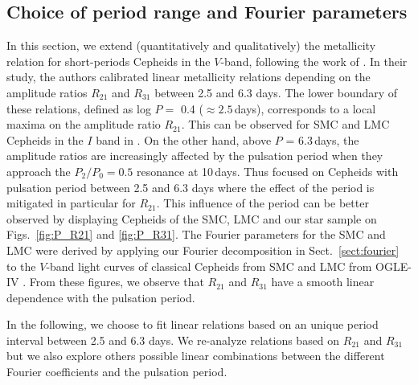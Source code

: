 \documentclass[article]{aa} %
\begin{document}
\subsection{Choice of period range and Fourier parameters}\label{fig:qualitative}
In this section, we extend (quantitatively and qualitatively) the metallicity relation for short-periods Cepheids in the $V$-band, following the work of \cite{Klagyivik2013}.  In their study, the authors calibrated linear metallicity relations depending on the amplitude ratios $R_{21}$ and $R_{31}$ between 2.5 and 6.3 days. The lower boundary of these relations, defined as log $P=$ 0.4 ($\approx2.5 \,$days), corresponds to a local maxima on the amplitude ratio $R_{21}$. This can be observed for SMC and LMC Cepheids in the $I$ band in \cite{Soszynski2008,Soszynski2010}. On the other hand, above $P$ = 6.3$\,$days, the amplitude ratios are increasingly affected by the pulsation period when they approach the $P_2/P_0=0.5$ resonance at 10$\,$days. Thus \cite{Klagyivik2013} focused on Cepheids with pulsation period between 2.5 and 6.3 days where the effect of the period is mitigated in particular for $R_{21}$. This influence of the period can be better observed by displaying Cepheids of the SMC, LMC and our star sample on Figs.~\ref{fig:P_R21} and \ref{fig:P_R31}.  The Fourier parameters for the SMC and LMC were derived by applying our Fourier decomposition in Sect.~\ref{sect:fourier} to the $V$-band light curves of classical Cepheids from SMC and LMC from OGLE-IV  \citep{Udalski2015,Udalski2018,Soszynski2017}.  From these figures, we observe that $R_{21}$ and $R_{31}$ have a smooth linear dependence with the pulsation period. 

In the following, we choose to fit linear relations based on an unique period interval between 2.5 and 6.3 days. We re-analyze relations based on $R_{21}$ and $R_{31}$ but we also explore others possible linear combinations between the different Fourier coefficients and the pulsation period.

 
\end{document}
